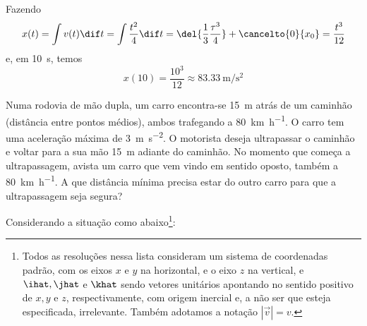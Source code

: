 \documentclass[]{IMTexam}
\begin{document}
\begin{questions}
\begin{solution}
\begin{multi}
		\end{multi}

		\begin{multi}
			Fazendo
			\[ x(t)=\int v(t)\dif t=\int \dfrac{t^{2}}{4} \dif t=\del{\dfrac{1}{3}\dfrac{\tau^{3}}{4}}+\cancelto{0}{x_0}=\dfrac{t^{3}}{12} \]
			e, em \SI{10}{\second}, temos
			\[ x(10)=\dfrac{10^{3}}{12}\approx\SI{83,33}{\meter\per\second\squared} \]

			\nextcol

			\centering
		\end{multi}

	\end{solution}

	\question
	Numa rodovia de mão dupla, um carro encontra-se \SI{15}{\meter} atrás de um caminhão (distância entre pontos médios), ambos trafegando a \SI{80}{\kilo\meter\per\hour}. O carro tem uma aceleração máxima de \SI{3}{\meter\per\second\squared}. O motorista deseja ultrapassar o caminhão e voltar para a sua mão \SI{15}{\meter} adiante do caminhão. No momento que começa a ultrapassagem, avista um carro que vem vindo em sentido oposto, também a \SI{80}{\kilo\meter\per\hour}. A que distância mínima precisa estar do outro carro para que a ultrapassagem seja segura?


	\begin{solution}
		Considerando a situação como abaixo\footnote{Todos as resoluções nessa lista consideram um sistema de coordenadas padrão, com os eixos $ x $ e $ y $ na horizontal, e o eixo $ z $ na vertical, e $ \ihat,\jhat $ e $ \khat $ sendo vetores unitários apontando no sentido positivo de $ x,y $ e $ z $, respectivamente, com origem inercial e, a não ser que esteja especificada, irrelevante. Também adotamos a notação $ |\vec{v}|=v $.}:


\end{solution}
\end{questions}
\end{document}
